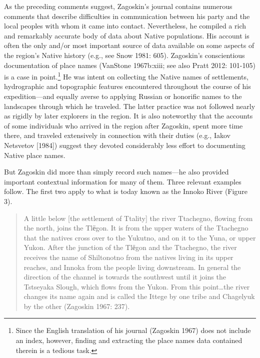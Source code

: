 As the preceding comments suggest, Zagoskin’s journal contains numerous comments that describe difficulties in communication between his party and the local peoples with whom it came into contact. Nevertheless, he compiled a rich and remarkably accurate body of data about Native populations. His account is often the only and/or most important source of data available on some aspects of the region’s Native history (e.g., see Snow 1981: 605). Zagoskin’s conscientious documentation of place names (VanStone 1967b:xiii; see also Pratt 2012: 101-105) is a case in point.\footnote{Since the English translation of his journal (Zagoskin 1967) does not include an index, however, finding and extracting the place names data contained therein is a tedious task.} He was intent on collecting the Native names of settlements, hydrographic and topographic features encountered throughout the course of his expedition—and equally averse to applying Russian or honorific names to the landscapes through which he traveled. The latter practice was not followed nearly as rigidly by later explorers in the region. It is also noteworthy that the accounts of some individuals who arrived in the region after Zagoskin, spent more time there, and traveled extensively in connection with their duties (e.g., Iakov Netsvetov [1984]) suggest they devoted considerably less effort to documenting Native place names.

But Zagoskin did more than simply record such names—he also provided important contextual information for many of them. Three relevant examples follow. The first two apply to what is today known as the Innoko River (Figure 3).

\begin{quote}
    A little below [the settlement of Ttality] the river Ttachegno, flowing from the north, joins the Tlёgon. It is from the upper waters of the Ttachegno that the natives cross over to the Yukutno, and on it to the Yuna, or upper Yukon. After the junction of the Tlёgon and the Ttachegno, the river receives the name of Shiltonotno from the natives living in its upper reaches, and Innoka from the people living downstream. In general the direction of the channel is towards the southwest until it joins the Tstseyaka Slough, which flows from the Yukon. From this point…the river changes its name again and is called the Ittege by one tribe and Chagelyuk by the other (Zagoskin 1967: 237).
\end{quote}

